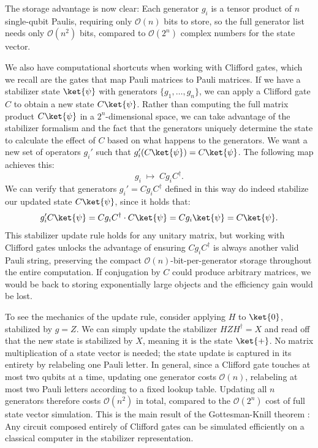 The storage advantage is now clear: Each generator $g_i$ is a tensor product of $n$ single-qubit Paulis, requiring only $\mathcal{O}(n)$ bits to store, so the full generator list needs only $\mathcal{O}(n^2)$ bits, compared to $\mathcal{O}(2^n)$ complex numbers for the state vector. 

We also have computational shortcuts when working with Clifford gates, which we recall are the gates that map Pauli matrices to Pauli matrices. If we have a stabilizer state $\ket{\psi}$ with generators $\{g_1, \ldots, g_n\}$, we can apply a Clifford gate $C$ to obtain a new state $C\ket{\psi}$. Rather than computing the full matrix product $C\ket{\psi}$ in a $2^n$-dimensional space, we can take advantage of the stabilizer formalism and the fact that the generators uniquely determine the state to calculate the effect of $C$ based on what happens to the generators. We want a new set of operators $g_i'$ such that $g_i'(C\ket{\psi}) = C\ket{\psi}$. The following map achieves this:
\[
    g_i \;\mapsto\; Cg_iC^\dagger.
\]
We can verify that generators $g_i' = Cg_iC^\dagger$ defined in this way do indeed stabilize our updated state $C\ket{\psi}$, since it holds that:
\[g_i'C\ket{\psi} = Cg_iC^\dagger \cdot C\ket{\psi} = Cg_i\ket{\psi} = C\ket{\psi}.\]
This stabilizer update rule holds for any unitary matrix, but working with Clifford gates unlocks the advantage of ensuring $Cg_iC^\dagger$ is always another valid Pauli string, preserving the compact $\mathcal{O}(n)$-bit-per-generator storage throughout the entire computation. If conjugation by $C$ could produce arbitrary matrices, we would be back to storing exponentially large objects and the efficiency gain would be lost.

To see the mechanics of the update rule, consider applying $H$ to $\ket{0}$, stabilized by $g = Z$. We can simply update the stabilizer $HZH^\dagger = X$ and read off that the new state is stabilized by $X$, meaning it is the state $\ket{+}$. No matrix multiplication of a state vector is needed; the state update is captured in its entirety by relabeling one Pauli letter. In general, since a Clifford gate touches at most two qubits at a time, updating one generator costs $\mathcal{O}(n)$, relabeling at most two Pauli letters according to a fixed lookup table. Updating all $n$ generators therefore costs $\mathcal{O}(n^2)$ in total, compared to the $\mathcal{O}(2^n)$ cost of full state vector simulation. This is the main result of the Gottesman-Knill theorem \cite{gottesman1998heisenbergrepresentationquantumcomputers}: Any circuit composed entirely of Clifford gates can be simulated efficiently on a classical computer in the stabilizer representation.

